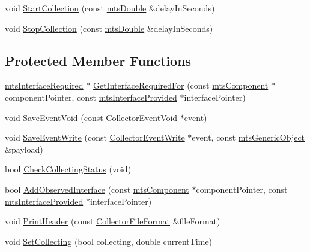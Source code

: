 {\bf }\par
\begin{DoxyCompactItemize}
\item 
void \hyperlink{classmts_collector_event_aceb830acb6f06d952ca3c9f19e5d3dc3}{Start\-Collection} (const \hyperlink{mts_generic_object_proxy_8h_a31e76b0190a8d3f9838626cd7b47bd75}{mts\-Double} \&delay\-In\-Seconds)
\item 
void \hyperlink{classmts_collector_event_afd6e55e376f1d008c6ba66ffd4353d18}{Stop\-Collection} (const \hyperlink{mts_generic_object_proxy_8h_a31e76b0190a8d3f9838626cd7b47bd75}{mts\-Double} \&delay\-In\-Seconds)
\end{DoxyCompactItemize}

\subsection*{Protected Member Functions}
\begin{DoxyCompactItemize}
\item 
\hyperlink{classmts_interface_required}{mts\-Interface\-Required} $\ast$ \hyperlink{classmts_collector_event_ae01c4c7fb83dbc8b55e9405e0964dae5}{Get\-Interface\-Required\-For} (const \hyperlink{classmts_component}{mts\-Component} $\ast$component\-Pointer, const \hyperlink{classmts_interface_provided}{mts\-Interface\-Provided} $\ast$interface\-Pointer)
\item 
void \hyperlink{classmts_collector_event_ad17e85726815169d5f3b7d3555c19d46}{Save\-Event\-Void} (const \hyperlink{classmts_collector_event_1_1_collector_event_void}{Collector\-Event\-Void} $\ast$event)
\item 
void \hyperlink{classmts_collector_event_adfff10f735b0b108a84fd1642420cc08}{Save\-Event\-Write} (const \hyperlink{classmts_collector_event_1_1_collector_event_write}{Collector\-Event\-Write} $\ast$event, const \hyperlink{classmts_generic_object}{mts\-Generic\-Object} \&payload)
\item 
bool \hyperlink{classmts_collector_event_afb73c656252aa7d8a9499b1ab69169c4}{Check\-Collecting\-Status} (void)
\item 
bool \hyperlink{classmts_collector_event_a253485e1bc58063b6f518ece60f2e82b}{Add\-Observed\-Interface} (const \hyperlink{classmts_component}{mts\-Component} $\ast$component\-Pointer, const \hyperlink{classmts_interface_provided}{mts\-Interface\-Provided} $\ast$interface\-Pointer)
\item 
void \hyperlink{classmts_collector_event_a74b00124de02baf70793abe467374162}{Print\-Header} (const \hyperlink{classmts_collector_base_aa228bed8144053d0bfa316f9ac9d0901}{Collector\-File\-Format} \&file\-Format)
\item 
void \hyperlink{classmts_collector_event_ad38b92d73fb2c2829037e9e89b6b7795}{Set\-Collecting} (bool collecting, double current\-Time)
\end{DoxyCompactItemize}
